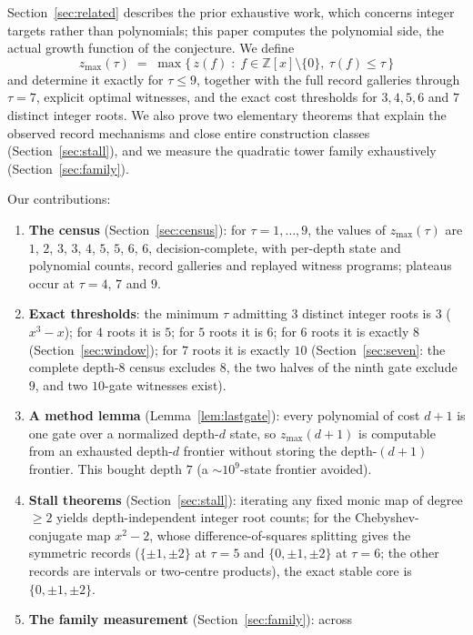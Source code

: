 \documentclass[11pt]{article}
\theoremstyle{definition}
\theoremstyle{remark}
\newcommand{\Z}{\mathbb{Z}}
\newcommand{\zmax}{z_{\max}}
\begin{document}
Section~\ref{sec:related} describes the prior exhaustive work, which concerns integer targets
rather than polynomials; this paper computes the polynomial side, the actual growth function of
the conjecture. We define
\[
\zmax(\tau) \;=\; \max\{\, z(f) \;:\; f \in \Z[x] \setminus \{0\},\ \tau(f) \le \tau \,\}
\]
and determine it exactly for $\tau \le 9$, together with the full record galleries
through $\tau = 7$, explicit optimal witnesses, and the exact cost thresholds for
$3, 4, 5, 6$ and $7$ distinct integer roots. We also
prove two elementary theorems that
explain the observed record mechanisms and close entire construction classes
(Section~\ref{sec:stall}), and we measure the quadratic tower family exhaustively
(Section~\ref{sec:family}).

Our contributions:
\begin{enumerate}
\item \textbf{The census} (Section~\ref{sec:census}): for $\tau = 1,\dots,9$, the
values of $\zmax(\tau)$ are $1$, $2$, $3$, $3$, $4$, $5$, $5$, $6$, $6$,
decision-complete, with per-depth state and polynomial counts, record galleries
and replayed witness programs; plateaus occur at $\tau = 4$, $7$ and $9$.
\item \textbf{Exact thresholds}: the minimum $\tau$ admitting $3$ distinct integer
roots is $3$ ($x^3 - x$); for $4$ roots it is $5$; for $5$ roots it is $6$; for $6$
roots it is exactly $8$ (Section~\ref{sec:window}); for $7$ roots it is exactly $10$
(Section~\ref{sec:seven}: the complete depth-$8$ census excludes $8$, the two halves of
the ninth gate exclude $9$, and two $10$-gate witnesses exist).
\item \textbf{A method lemma} (Lemma~\ref{lem:lastgate}): every polynomial of cost
$d + 1$ is one gate over a normalized depth-$d$ state, so $\zmax(d+1)$ is computable
from an exhausted depth-$d$ frontier without storing the depth-$(d+1)$ frontier. This
bought depth $7$ (a $\sim$$10^9$-state frontier avoided).
\item \textbf{Stall theorems} (Section~\ref{sec:stall}): iterating any fixed monic
map of degree $\ge 2$ yields depth-independent integer root counts; for the
Chebyshev-conjugate map $x^2 - 2$, whose difference-of-squares splitting gives the
symmetric records ($\{\pm1,\pm2\}$ at $\tau = 5$ and $\{0,\pm1,\pm2\}$ at $\tau = 6$; the other
records are intervals or two-centre products), the exact stable core is $\{0, \pm 1, \pm 2\}$.
\item \textbf{The family measurement} (Section~\ref{sec:family}): across
$$
\end{enumerate}
\end{document}
